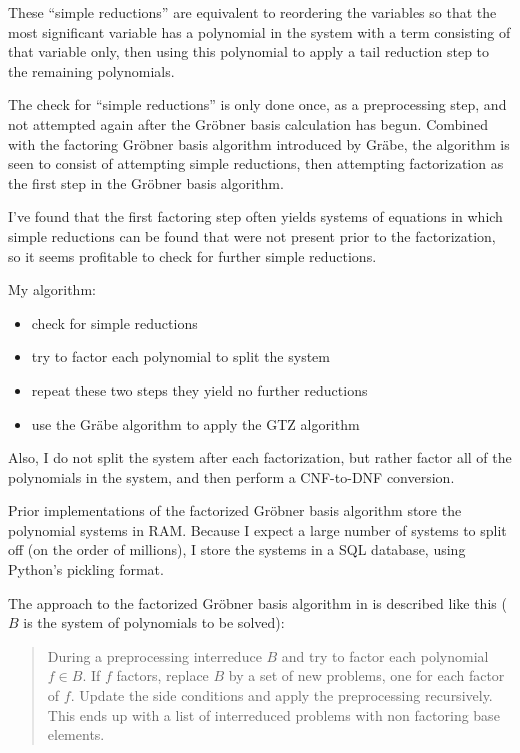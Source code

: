 \documentclass{article}
\begin{document}
These ``simple reductions'' are equivalent to reordering the variables
so that the most significant variable has a polynomial in
the system with a term consisting of that variable only,
then using this polynomial to apply a tail reduction step to the remaining polynomials.

The check for ``simple reductions'' is only done once, as a preprocessing step,
and not attempted again after the Gr\"obner basis calculation has begun.
Combined with the factoring Gr\"obner basis algorithm introduced by Gr\"abe,
the algorithm is seen to consist of attempting simple reductions, then
attempting factorization as the first step in the Gr\"obner basis algorithm.

I've found that the first factoring step often yields systems of equations in
which simple reductions can be found that were not present prior to
the factorization, so it seems profitable to check for further simple reductions.

My algorithm:

\begin{itemize}
\item check for simple reductions
\item try to factor each polynomial to split the system
\item repeat these two steps they yield no further reductions
\item use the Gr\"abe algorithm to apply the GTZ algorithm
\end{itemize}

Also, I do not split the system after each factorization, but rather factor
all of the polynomials in the system, and then perform a CNF-to-DNF conversion.

Prior implementations of the factorized Gr\"obner basis algorithm
store the polynomial systems in RAM.  Because I expect a large number
of systems to split off (on the order of millions), I store the
systems in a SQL database, using Python's pickling format.

The approach to the factorized Gr\"obner basis algorithm in \cite{Grabe06}
is described like this ($B$ is the system of polynomials to be solved):

\begin{quote}
During a preprocessing interreduce $B$ and try to factor each polynomial $f \in B$. If $f$ factors,
replace $B$ by a set of new problems, one for each factor of $f$. Update the side conditions
and apply the preprocessing recursively. This ends up with a list of interreduced problems
with non factoring base elements.
\end{quote}
\end{document}
